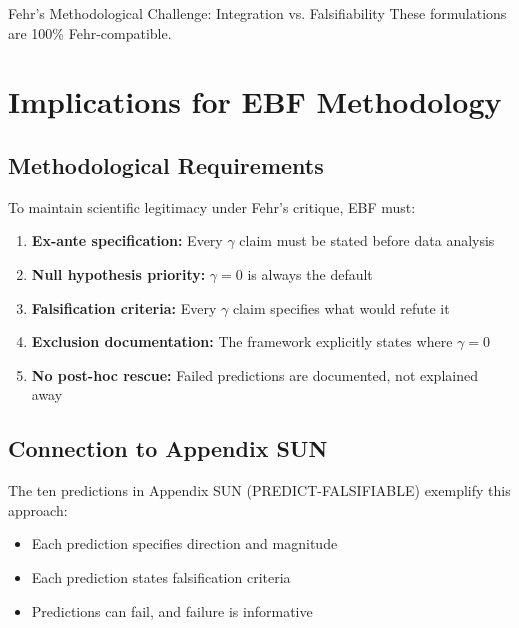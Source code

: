 \begin{chapter}{Fehr's Methodological Challenge: Integration vs. Falsifiability}
These formulations are 100\% Fehr-compatible.


\section{Implications for EBF Methodology}
\label{sec:implications}

\subsection{Methodological Requirements}

To maintain scientific legitimacy under Fehr's critique, EBF must:

\begin{enumerate}
    \item \textbf{Ex-ante specification:} Every $\gamma$ claim must be stated before data analysis

    \item \textbf{Null hypothesis priority:} $\gamma = 0$ is always the default

    \item \textbf{Falsification criteria:} Every $\gamma$ claim specifies what would refute it

    \item \textbf{Exclusion documentation:} The framework explicitly states where $\gamma = 0$

    \item \textbf{No post-hoc rescue:} Failed predictions are documented, not explained away
\end{enumerate}

\subsection{Connection to Appendix SUN}

The ten predictions in Appendix SUN (PREDICT-FALSIFIABLE) exemplify this approach:

\begin{itemize}[noitemsep]
    \item Each prediction specifies direction and magnitude
    \item Each prediction states falsification criteria
    \item Predictions can fail, and failure is informative
\end{itemize}


\end{chapter}
